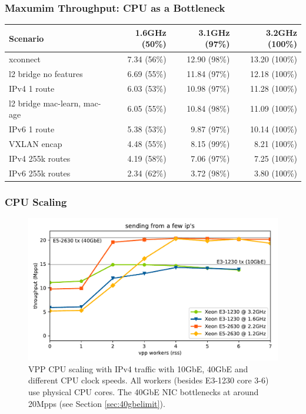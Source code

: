\begin{frame}
    \frametitle{Maxumim Throughput: CPU as a Bottleneck}
    \begin{table}[!ht]
        \vspace{5ex}
        \begin{tabular}[]{ l r r r }
            Scenario & 1.6GHz (50\%) & 3.1GHz (97\%)  & 3.2GHz (100\%) \\ 
            \midrule
            xconnect & 7.34 (56\%) & 12.90 (98\%) & 13.20 (100\%) \\ %
            l2 bridge no features & 6.69 (55\%) & 11.84 (97\%) & 12.18 (100\%) \\ %
            IPv4 1 route & 6.03 (53\%) & 10.98 (97\%) & 11.28 (100\%) \\ %
            l2 bridge mac-learn, mac-age & 6.05 (55\%) & 10.84 (98\%) & 11.09 (100\%) \\ %
            IPv6 1 route & 5.38 (53\%) & 9.87 (97\%) & 10.14 (100\%) \\ %
            VXLAN encap & 4.48 (55\%) & 8.15 (99\%) & 8.21 (100\%) \\ %
            IPv4 255k routes & 4.19 (58\%) & 7.06 (97\%) & 7.25 (100\%) \\ %
            IPv6 255k routes & 2.34 (62\%) & 3.72 (98\%) & 3.80 (100\%) \\ %
            \midrule
        \end{tabular}
        \label{bottleneck}
    \end{table}
\end{frame}

\begin{frame}
    \frametitle{CPU Scaling}
    \begin{figure}[!ht]
    \noindent\hspace{0.5mm}\includegraphics[width=\linewidth]{pics/throughput_summary_multicore.pdf}
    \caption{VPP CPU scaling with IPv4 traffic with 10GbE, 40GbE and different CPU clock speeds. All workers (besides E3-1230 core 3-6) use physical CPU cores. The 40GbE NIC bottlenecks at around 20Mpps (see Section \ref{sec:40gbelimit}). }
    \label{graph:multicore}
    \end{figure}
\end{frame}

